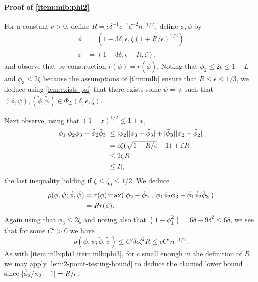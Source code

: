\documentclass[journal]{IEEEtran}
\newcommand{\1}{\boldsymbol{1}}
\DeclarePairedDelimiter{\abs}{\lvert}{\rvert}
\begin{document}
\paragraph{Proof of \cref{item:mlb:phi2}}
For a constant $c>0$, define
\(R=c\delta^{-1} \epsilon^{-1}\zeta^{-2}n^{-1/2},\) define $\phi,\tilde{\phi}$ by
\begin{align*}%
	\phi&=(1-3\delta,\epsilon,\zeta(1+R/\epsilon)^{1/2})\\
	\tilde{\phi}&=(1-3\delta,\epsilon+R,\zeta),
\end{align*}
and observe that by construction $r(\phi)=r(\tilde{\phi})$.
Noting that $\phi_2\leq 2\epsilon\leq 1-L$ and $\phi_3\leq 2\zeta$ because the assumptions of \cref{thm:mlb} ensure that $R\leq \epsilon\leq 1/3$, we deduce using \cref{lem:exists-psi} that there exists some $\psi=\tilde{\psi}$ such that $(\phi,\psi),(\tilde{\phi},\tilde{\psi})\in \Phi_L(\delta,\epsilon,\zeta)$.%

Next observe, using that $(1+x)^{1/2}\leq 1+x$,
\begin{align*}
  \phi_1\abs{\phi_2\phi_3-\tilde{\phi}_2\tilde{\phi}_3}
  &\leq \abs{\phi_2}\abs{\phi_3-\tilde{\phi}_3} + \abs{\tilde{\phi}_3}\abs{\phi_2-\tilde{\phi}_2}\\ &=\epsilon\zeta(\sqrt{1+R/\epsilon}-1) + \zeta R\\
  &\leq 2\zeta R\\
  &\leq R,
\end{align*}
the last inequality holding if $\zeta\leq \zeta_0\leq 1/2$. We deduce
\begin{align*}
  \rho(\phi,\psi; \tilde{\phi},\tilde{\psi})
  &=r(\phi)\max( \abs{\phi_2- \tilde{\phi}_2},\abs{\phi_1\phi_2\phi_3-\tilde{\phi}_1\tilde{\phi}_2\tilde{\phi}_3})\\
  &= R r(\phi).
\end{align*} Again using that $\phi_3\leq 2\zeta$ and noting also that $(1-\phi_1^2)= 6\delta-9 \delta^2 \leq 6\delta$, we see that for some $C'>0$ we have
\begin{equation*}
	\rho(\phi,\psi;\tilde{\phi},\tilde{\psi}) \leq C' \delta \epsilon \zeta^2 R\leq cC'n^{-1/2}.
\end{equation*}
As with \cref{item:mlb:phi1,item:mlb:phi3}, for $c$ small enough in the definition of $R$ we may apply \cref{lem:2-point-testing-bound} to deduce the claimed lower bound since $\abs{\tilde{\phi}_2/\phi_2-1}=R/\epsilon$.
\end{document}
